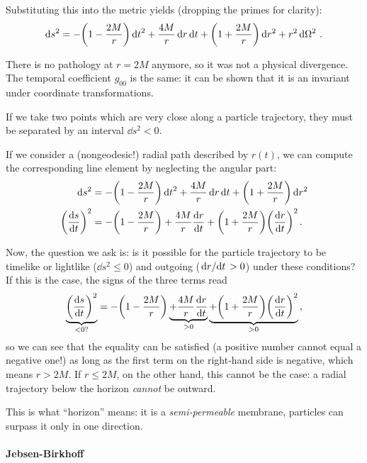 \documentclass[main.tex]{subfiles}
\begin{document}
Substituting this into the metric yields (dropping the primes for clarity):
%
\begin{align}
\dd{s^2} = - \qty(1 - \frac{2M}{r}) \dd{t}^2
+ \frac{4M}{r} \dd{r} \dd{t} + \qty(1 + \frac{2M}{r}) \dd{r^2}
+ r^2 \dd{\Omega^2}
\,.
\end{align}

There is no pathology at \(r = 2M\) anymore, so it was not a physical divergence. 
The temporal coefficient \(g_{00} \) is the same: it can be shown that it is an invariant under coordinate transformations. 

If we take two points which are very close along a particle trajectory, they must be separated by an interval \(\dd{s}^2 < 0\). 

If we consider a (nongeodesic!) radial path described by \(r(t)\), we can compute the corresponding line element by neglecting the angular part: 
%
\begin{align}
\dd{s^2} &= - \qty(1 - \frac{2M}{r}) \dd{t}^2
+ \frac{4M}{r} \dd{r} \dd{t} + \qty(1 + \frac{2M}{r}) \dd{r^2}  \\
\qty( \dv{s}{t})^2 &= - \qty(1- \frac{2M}{r})
+ \frac{4M}{r} \dv{r}{t} + \qty(1 + \frac{2M}{r} ) \qty(\dv{r}{t})^2
\,.
\end{align}

Now, the question we ask is: is it possible for the particle trajectory to be timelike or lightlike (\(\dd{s}^2 \leq 0\)) and outgoing (\(\dv*{r}{t} > 0\)) under these conditions? If this is the case, the signs of the three terms read 
%
\begin{align}
\underbrace{\qty(\dv{s}{t})^2}_{< 0 ?}
= 
- \qty(1- \frac{2M}{r})
\underbrace{+ \frac{4M}{r} \dv{r}{t}}_{> 0 } \underbrace{+ \qty(1 + \frac{2M}{r} ) \qty(\dv{r}{t})^2}_{> 0}
\,,
\end{align}
%
so we can see that the equality can be satisfied (a positive number cannot equal a negative one!) as long as the first term on the right-hand side is negative, which means \(r > 2M\). 
If \(r \leq 2M\), on the other hand, this cannot be the case: a radial trajectory below the horizon \emph{cannot} be outward.

This is what ``horizon'' means: it is a \emph{semi-permeable} membrane, particles can surpass it only in one direction. 

\paragraph{Jebsen-Birkhoff}
\end{document}

